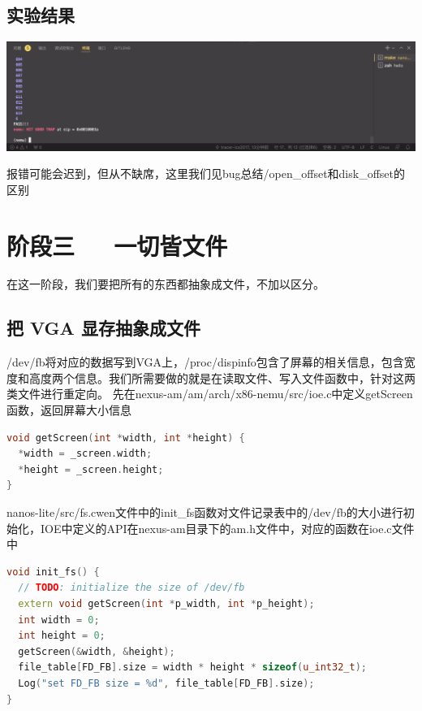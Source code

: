 \documentclass[UTF8,a4paper,10pt]{ctexart}
\begin{document}
\subsection{实验结果}
\begin{center}
  \includegraphics*[scale = 0.25]{pic/阶段二}
\end{center}

\color{red} 报错可能会迟到，但从不缺席，这里我们见bug总结/open\_offset和disk\_offset的区别

\normalcolor

\section{阶段三\ \ \ 一切皆文件}
在这一阶段，我们要把所有的东西都抽象成文件，不加以区分。

\subsection{把 VGA 显存抽象成文件}
/dev/fb将对应的数据写到VGA上，/proc/dispinfo包含了屏幕的相关信息，包含宽度和高度两个信息。我们所需要做的就是在读取文件、写入文件函数中，针对这两类文件进行重定向。
先在nexus-am/am/arch/x86-nemu/src/ioe.c中定义getScreen函数，返回屏幕大小信息
\begin{lstlisting}[language = C++]
void getScreen(int *width, int *height) {
  *width = _screen.width;
  *height = _screen.height;
} 
\end{lstlisting}

nanos-lite/src/fs.cwen文件中的init\_fs函数对文件记录表中的/dev/fb的大小进行初始化，IOE中定义的API在nexus-am目录下的am.h文件中，对应的函数在ioe.c文件中
\begin{lstlisting}[language = C++]
void init_fs() {
  // TODO: initialize the size of /dev/fb
  extern void getScreen(int *p_width, int *p_height);
  int width = 0;
  int height = 0;
  getScreen(&width, &height);
  file_table[FD_FB].size = width * height * sizeof(u_int32_t);
  Log("set FD_FB size = %d", file_table[FD_FB].size);
}
\end{lstlisting}
\end{document}
